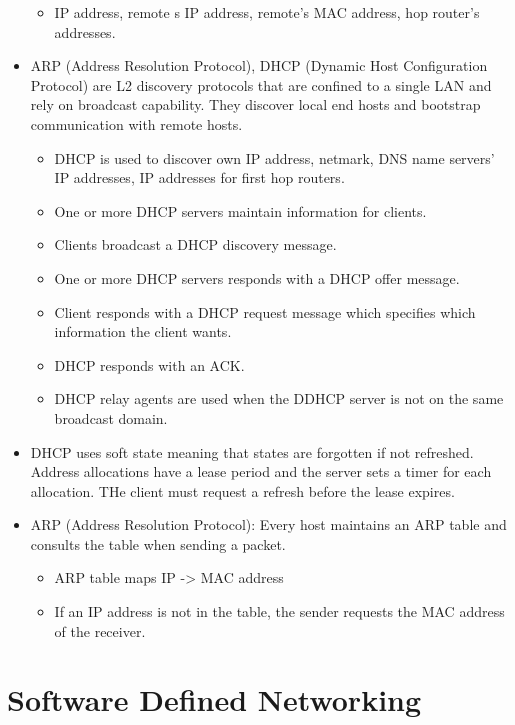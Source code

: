 \begin{itemize}
  \begin{itemize}
  \tightlist
  \item
    IP address, remote s IP address, remote's MAC address, hop router's
    addresses.
  \end{itemize}
\item
  ARP (Address Resolution Protocol), DHCP (Dynamic Host Configuration
  Protocol) are L2 discovery protocols that are confined to a single LAN
  and rely on broadcast capability. They discover local end hosts and
  bootstrap communication with remote hosts.

  \begin{itemize}
  \tightlist
  \item
    DHCP is used to discover own IP address, netmark, DNS name servers'
    IP addresses, IP addresses for first hop routers.
  \item
    One or more DHCP servers maintain information for clients.
  \item
    Clients broadcast a DHCP discovery message.
  \item
    One or more DHCP servers responds with a DHCP offer message.
  \item
    Client responds with a DHCP request message which specifies which
    information the client wants.
  \item
    DHCP responds with an ACK.
  \item
    DHCP relay agents are used when the DDHCP server is not on the same
    broadcast domain.
  \end{itemize}
\item
  DHCP uses soft state meaning that states are forgotten if not
  refreshed. Address allocations have a lease period and the server sets
  a timer for each allocation. THe client must request a refresh before
  the lease expires.
\item
  ARP (Address Resolution Protocol): Every host maintains an ARP table
  and consults the table when sending a packet.

  \begin{itemize}
  \tightlist
  \item
    ARP table maps IP -\textgreater{} MAC address
  \item
    If an IP address is not in the table, the sender requests the MAC
    address of the receiver.
  \end{itemize}
\end{itemize}

\hypertarget{software-defined-networking}{%
\section{Software Defined
Networking}\label{software-defined-networking}}

